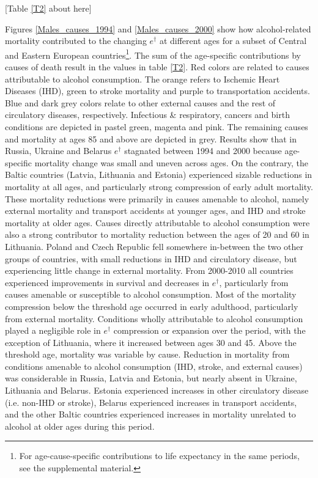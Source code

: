 \documentclass{article}
\begin{document}
\begin{spacing}{1.5}
\begin{center}
[Table  \ref{T2} about here]\\
\end{center}


Figures \ref{Males_causes_1994} and \ref{Males_causes_2000} show how alcohol-related mortality contributed to the changing $e^\dagger$ at different ages for a subset of Central and Eastern European countries\footnote{For age-cause-specific contributions to life expectancy in the same periods, see the supplemental material.}. The sum of the age-specific contributions by causes of death result in the values in table \ref{T2}. Red colors are related to causes attributable to alcohol consumption. The orange refers to Ischemic Heart Diseases (IHD), green to stroke mortality and purple to transportation accidents. Blue and dark grey colors relate to other external causes and the rest of circulatory diseases, respectively. Infectious \& respiratory, cancers and birth conditions are depicted in pastel green, magenta and pink. The remaining causes and mortality at ages 85 and above are depicted in grey.
Results show that in Russia, Ukraine and Belarus $e^\dagger$ stagnated between 1994 and 2000 because age-specific mortality change was small and uneven across ages. On the contrary, the Baltic countries (Latvia, Lithuania and Estonia) experienced sizable reductions in mortality at all ages, and particularly strong compression of early adult mortality. These mortality reductions were primarily in causes amenable to alcohol, namely external mortality and transport accidents at younger ages, and IHD and stroke mortality at older ages. Causes directly attributable to alcohol consumption were also a strong contributor to mortality reduction between the ages of 20 and 60 in Lithuania. Poland and Czech Republic fell somewhere in-between the two other groups of countries, with small reductions in IHD and circulatory disease, but experiencing little change in external mortality.
From 2000-2010 all countries experienced improvements in survival and decreases in $e^\dagger$, particularly from causes amenable or susceptible to alcohol consumption. Most of the mortality compression below the threshold age occurred in early adulthood, particularly from external mortality. Conditions wholly attributable to alcohol consumption played a negligible role in $e^\dagger$ compression or expansion over the period, with the exception of Lithuania, where it increased between ages 30 and 45. Above the threshold age, mortality was variable by cause. Reduction in mortality from conditions amenable to alcohol consumption (IHD, stroke, and external causes) was considerable in Russia, Latvia and Estonia, but nearly absent in Ukraine, Lithuania and Belarus. Estonia experienced increases in other circulatory disease (i.e. non-IHD or stroke), Belarus experienced increases in transport accidents, and the other Baltic countries experienced increases in mortality unrelated to alcohol at older ages during this period.



\end{spacing}
\end{document}
